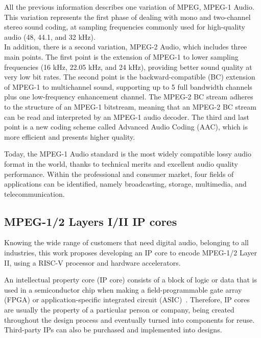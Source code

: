 All the previous information describes one variation of MPEG, MPEG-1 Audio. This variation represents the first phase of dealing with mono and two-channel stereo sound coding, at sampling frequencies commonly used for high-quality audio (48, 44.1, and 32 kHz).\\
In addition, there is a second variation, MPEG-2 Audio, which includes three main points.
The first point is the extension of MPEG-1 to lower sampling frequencies (16 kHz, 22.05 kHz, and 24 kHz), providing better sound quality at very low bit rates.
The second point is the backward-compatible (BC) extension of MPEG-1 to multichannel sound, supporting up to 5 full bandwidth channels plus one low-frequency enhancement channel. The MPEG-2 BC stream adheres to the structure of an MPEG-1 bitstream, meaning that an MPEG-2 BC stream can be read and interpreted by an MPEG-1 audio decoder.
The third and last point is a new coding scheme called Advanced Audio Coding (AAC), which is more efficient and presents higher quality.
 
Today, the MPEG-1 Audio standard is the most widely compatible lossy audio format in the world, thanks to technical merits and excellent audio quality performance.
Within the professional and consumer market, four fields of applications can be identified, namely broadcasting, storage, multimedia, and telecommunication. %


\subsection{MPEG-1/2 Layers I/II IP cores}

Knowing the wide range of customers that need digital audio, belonging to all industries, this work proposes developing an IP core to encode MPEG-1/2 Layer II, using a RISC-V processor and hardware accelerators.
 
An intellectual property core (IP core) consists of a block of logic or data that is used in a semiconductor chip when making a field-programmable gate array (FPGA) or application-specific integrated circuit (ASIC)~\cite{fpga}.
Therefore, IP cores are usually the property of a particular person or company, being created throughout the design process and eventually turned into components for reuse. Third-party IPs can also be purchased and implemented into designs. 


